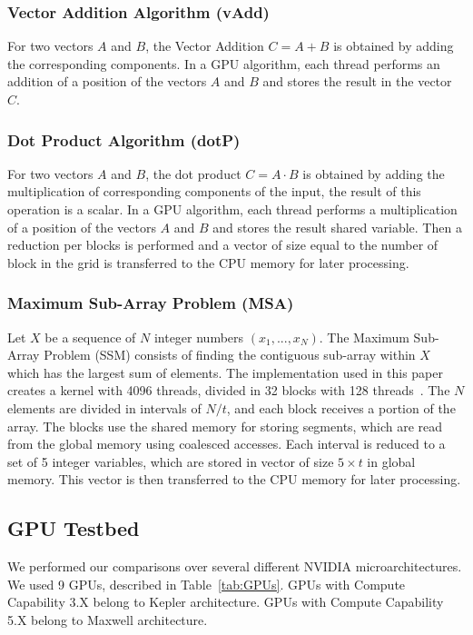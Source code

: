 \subsubsection{\textbf{Vector Addition Algorithm (vAdd)}}
For two vectors $A$ and $B$, the Vector Addition $C = A + B$ is obtained by adding the corresponding components. In a GPU algorithm, each thread performs an addition of a position of the vectors $A$ and $B$ and stores the result in the vector $C$. 

\subsubsection{\textbf{Dot Product Algorithm (dotP)}}
For two vectors $A$ and $B$, the dot product $C = A \cdot B$ is obtained by adding the multiplication of corresponding components of the input, the result of this operation is a scalar. In a GPU algorithm, each thread performs a multiplication of a position of the vectors $A$ and $B$ and stores the result shared variable. Then a reduction per blocks is performed and a vector of size equal to the number of block in the grid is transferred to the CPU memory for later processing. 


\subsubsection{\textbf{Maximum Sub-Array Problem (MSA)}}
Let $X$ be a sequence of $N$ integer numbers $(x_1, ... , x_N)$. The Maximum Sub-Array Problem (SSM) consists of finding the contiguous sub-array within $X$ which has the largest sum of elements. The implementation used in this paper creates a kernel with 4096 threads, divided in 32 blocks with 128 threads~\cite{Cleber:Thesis}. The $N$ elements are divided in intervals of $N/t$, and each block receives a portion of the array. The blocks use the shared memory for storing segments, which are read from the global memory using coalesced accesses. Each interval is reduced to a set of 5 integer variables, which are stored in vector of size $5 \times t$ in global memory. This vector is then transferred to the CPU memory for later processing. 

\subsection{GPU Testbed}\label{ssec:GPUTestbed}
We performed our comparisons over several different NVIDIA microarchitectures. We used 9 GPUs, described in Table~\ref{tab:GPUs}. GPUs with Compute Capability 3.X belong to Kepler architecture. GPUs with Compute Capability 5.X belong to Maxwell architecture. 

